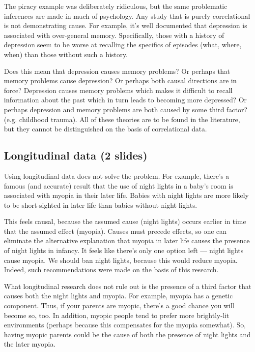 \documentclass[12pt]{article}
\begin{document}
The piracy example was deliberately ridiculous, but the same
problematic inferences are made in much of psychology. Any study that
is purely correlational is not demonstrating cause. For example, it's
well documented that depression is associated with over-general
memory. Specifically, those with a history of depression seem to be
worse at recalling the specifics of episodes (what, where, when) than
those without such a history.

Does this mean that depression causes memory problems? Or perhaps that
memory problems cause depression? Or perhaps both causal directions
are in force? Depression causes memory problems which makes it
difficult to recall information about the past which in turn leads to
becoming more depressed? Or perhaps depression and memory problems are
both caused by some third factor? (e.g. childhood trauma). All of
these theories are to be found in the literature, but they cannot be
distinguished on the basis of correlational data.

\subsection{Longitudinal data (2 slides)}

Using longitudinal data does not solve the problem. For example,
there's a famous (and accurate) result that the use of night lights in
a baby's room is associated with myopia in their later life. Babies
with night lights are more likely to be short-sighted in later life
than babies without night lights.

This feels causal, because the assumed cause (night lights) occurs
earlier in time that the assumed effect (myopia). Causes must precede
effects, so one can eliminate the alternative explanation that myopia
in later life causes the presence of night lights in infancy. It feels
like there's only one option left --- night lights cause myopia. We
should ban night lights, because this would reduce myopia. Indeed,
such recommendations were made on the basis of this research.

What longitudinal research does not rule out is the presence of a
third factor that causes both the night lights and myopia. For
example, myopia has a genetic component. Thus, if your parents are
myopic, there's a good chance you will become so, too. In addition,
myopic people tend to prefer more brightly-lit environments (perhaps
because this compensates for the myopia somewhat). So, having myopic
parents could be the cause of both the presence of night lights and
the later myopia.
\end{document}
